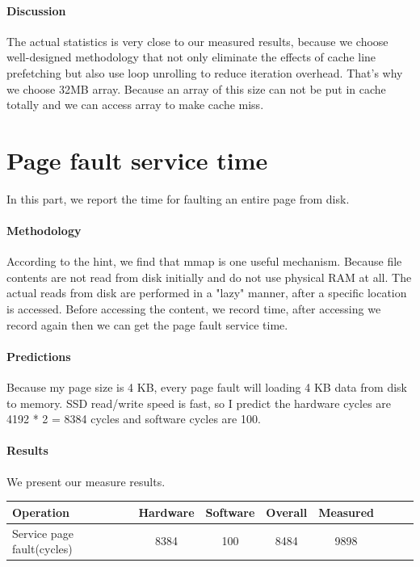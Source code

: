 \paragraph{Discussion}
The actual statistics is very close to our measured results, because we choose well-designed methodology that not only eliminate the effects of cache line prefetching but also use loop unrolling to reduce iteration overhead. That's why we choose 32MB array. Because an array of this size can not be put in cache totally and we can access array to make cache miss.

\section{Page fault service time}
In this part, we report the time for faulting an entire page from disk.

\paragraph{Methodology}
According to the hint, we find that mmap is one useful mechanism. Because file contents are not read from disk initially and do not use physical RAM at all. The actual reads from disk are performed in a "lazy" manner, after a specific location is accessed. Before accessing the content, we record time, after accessing we record again then we can get the page fault service time.

\paragraph{Predictions}
Because my page size is 4 KB, every page fault will loading 4 KB data from disk to memory. SSD read/write speed is fast, so I predict the hardware cycles are 4192 * 2 = 8384 cycles and software cycles are 100.

\paragraph{Results}
We present our measure results.

\begin{center}
\begin{tabular}{l*{6}{c}r}
Operation   & Hardware  & Software  & Overall  & Measured   \\
\hline
Service page fault(cycles) & 8384 & 100 & 8484 & 9898  \\

\end{tabular}
\end{center}

